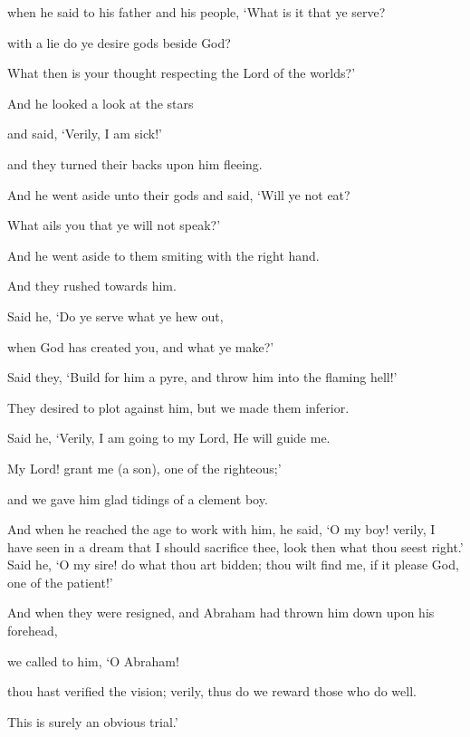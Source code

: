\documentclass[fontsize=14pt, letterpaper, notitlepage, openany, DIV=12]{scrbook} %
\begin{document}
\noindent[37:85]
when he said to his father and his people, `What is it that ye serve?

\noindent[37:86]
with a lie do ye desire gods beside God?

\noindent[37:87]
What then is your thought respecting the Lord of the worlds?'

\noindent[37:88]
And he looked a look at the stars

\noindent[37:89]
and said, `Verily, I am sick!'

\noindent[37:90]
and they turned their backs upon him fleeing.

\noindent[37:91]
And he went aside unto their gods and said, `Will ye not eat?

\noindent[37:92]
What ails you that ye will not speak?'

\noindent[37:93]
And he went aside to them smiting with the right hand.

\noindent[37:94]
And they rushed towards him.

\noindent[37:95]
Said he, `Do ye serve what ye hew out,

\noindent[37:96]
when God has created you, and what ye make?'

\noindent[37:97]
Said they, `Build for him a pyre, and throw him into the flaming hell!'

\noindent[37:98]
They desired to plot against him, but we made them inferior.

\noindent[37:99]
Said he, `Verily, I am going to my Lord, He will guide me.

\noindent[37:100]
My Lord! grant me (a son), one of the righteous;'

\noindent[37:101]
and we gave him glad tidings of a clement boy.

\noindent[37:102]
And when he reached the age to work with him, he said, `O my boy! verily, I have seen
in a dream that I should sacrifice thee, look then what thou seest right.' Said he, `O my sire! do
what thou art bidden; thou wilt find me, if it please God, one of the patient!'

\noindent[37:103]
And when they were resigned, and Abraham had thrown him down upon his forehead,

\noindent[37:104]
we called to him, `O Abraham!

\noindent[37:105]
thou hast verified the vision; verily, thus do we reward those who do well.

\noindent[37:106]
This is surely an obvious trial.'
\end{document}
